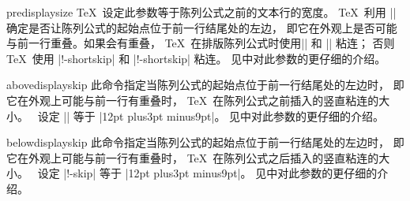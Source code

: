\begindesc
\cts predisplaysize {}
\explain
\TeX\ 设定此参数等于陈列公式之前的文本行的宽度。
\TeX\ 利用 |\predisplaysize| 确定是否让陈列公式的起始点位于前一行结尾处的左边，
即它在外观上是否可能与前一行重叠。如果会有重叠，
\TeX\ 在排版陈列公式时使用|\abovedisplayskip| 和 |\belowdisplayskip| 粘连；
否则 \TeX\ 使用 |\abovedisplay!-shortskip| 和 |\belowdisplay!-shortskip| 粘连。
见中对此参数的更仔细的介绍。
\enddesc

\begindesc
\cts abovedisplayskip {}
\explain
此命令指定当陈列公式的起始点位于前一行结尾处的左边时，
即它在外观上可能与前一行有重叠时，
\TeX\ 在陈列公式之前插入的竖直粘连的大小。
\PlainTeX\ 设定 |\abovedisplayskip| 等于 |12pt plus3pt minus9pt|。
见中对此参数的更仔细的介绍。
\enddesc

\begindesc
\cts belowdisplayskip {}
\explain
此命令指定当陈列公式的起始点位于前一行结尾处的左边时，
即它在外观上可能与前一行有重叠时，
\TeX\ 在陈列公式之后插入的竖直粘连的大小。
\PlainTeX\ 设定 |\belowdisplay!-skip| 等于 |12pt plus3pt minus9pt|。
见中对此参数的更仔细的介绍。
\enddesc

